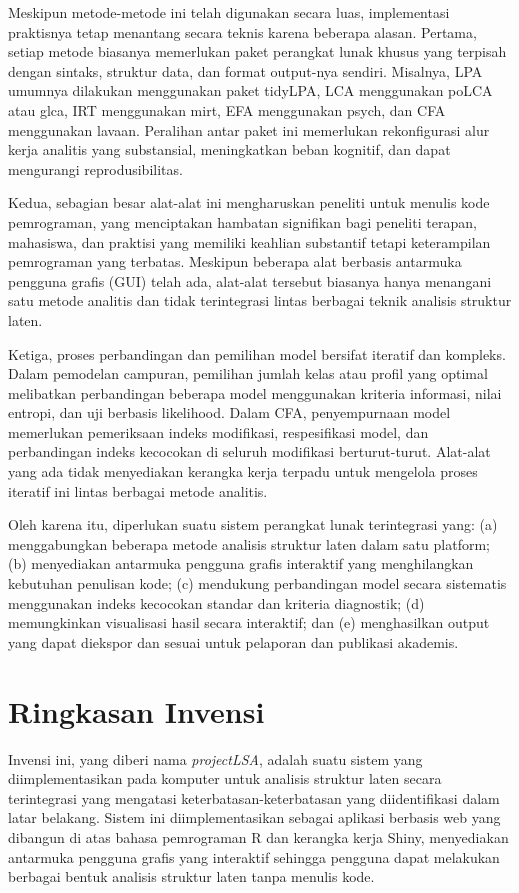 \documentclass[12pt,a4paper]{article}
\begin{document}
Meskipun metode-metode ini telah digunakan secara luas, implementasi praktisnya tetap menantang secara teknis karena beberapa alasan. Pertama, setiap metode biasanya memerlukan paket perangkat lunak khusus yang terpisah dengan sintaks, struktur data, dan format output-nya sendiri. Misalnya, LPA umumnya dilakukan menggunakan paket tidyLPA, LCA menggunakan poLCA atau glca, IRT menggunakan mirt, EFA menggunakan psych, dan CFA menggunakan lavaan. Peralihan antar paket ini memerlukan rekonfigurasi alur kerja analitis yang substansial, meningkatkan beban kognitif, dan dapat mengurangi reprodusibilitas.

Kedua, sebagian besar alat-alat ini mengharuskan peneliti untuk menulis kode pemrograman, yang menciptakan hambatan signifikan bagi peneliti terapan, mahasiswa, dan praktisi yang memiliki keahlian substantif tetapi keterampilan pemrograman yang terbatas. Meskipun beberapa alat berbasis antarmuka pengguna grafis (GUI) telah ada, alat-alat tersebut biasanya hanya menangani satu metode analitis dan tidak terintegrasi lintas berbagai teknik analisis struktur laten.

Ketiga, proses perbandingan dan pemilihan model bersifat iteratif dan kompleks. Dalam pemodelan campuran, pemilihan jumlah kelas atau profil yang optimal melibatkan perbandingan beberapa model menggunakan kriteria informasi, nilai entropi, dan uji berbasis likelihood. Dalam CFA, penyempurnaan model memerlukan pemeriksaan indeks modifikasi, respesifikasi model, dan perbandingan indeks kecocokan di seluruh modifikasi berturut-turut. Alat-alat yang ada tidak menyediakan kerangka kerja terpadu untuk mengelola proses iteratif ini lintas berbagai metode analitis.

Oleh karena itu, diperlukan suatu sistem perangkat lunak terintegrasi yang: (a) menggabungkan beberapa metode analisis struktur laten dalam satu platform; (b) menyediakan antarmuka pengguna grafis interaktif yang menghilangkan kebutuhan penulisan kode; (c) mendukung perbandingan model secara sistematis menggunakan indeks kecocokan standar dan kriteria diagnostik; (d) memungkinkan visualisasi hasil secara interaktif; dan (e) menghasilkan output yang dapat diekspor dan sesuai untuk pelaporan dan publikasi akademis.

\section{Ringkasan Invensi}

Invensi ini, yang diberi nama \textit{projectLSA}, adalah suatu sistem yang diimplementasikan pada komputer untuk analisis struktur laten secara terintegrasi yang mengatasi keterbatasan-keterbatasan yang diidentifikasi dalam latar belakang. Sistem ini diimplementasikan sebagai aplikasi berbasis web yang dibangun di atas bahasa pemrograman R dan kerangka kerja Shiny, menyediakan antarmuka pengguna grafis yang interaktif sehingga pengguna dapat melakukan berbagai bentuk analisis struktur laten tanpa menulis kode.
\end{document}
